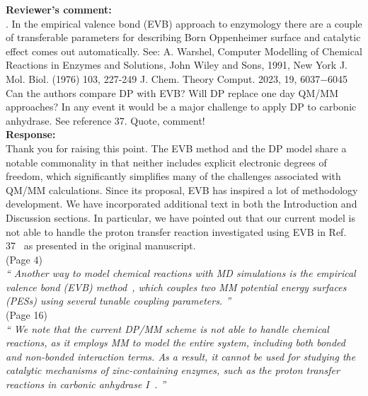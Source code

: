\documentclass[doublespace,prb,aps,preprint]{revtex4}
\newcommand{\Quote}[1]{\textsl{``#1''}}
\newenvironment{Comment}{ {\bf \indent Reviewer's comment: \\} \setlength{\parindent}{1cm}  \sffamily }{ \ignorespacesafterend \\}
\newenvironment{Reply}{  {\bf Response: \\}  \setlength{\parindent}{1cm} \normalfont }{ \ignorespacesafterend \vspace{5mm}}
\newcommand{\HJ}[1]{\textcolor{red}{#1}}
\begin{document}
\begin{Comment}
3. In the empirical valence bond (EVB) approach to enzymology there are a couple of transferable parameters for describing Born Oppenheimer surface and catalytic effect comes out automatically.
See:
A. Warshel, Computer Modelling of Chemical Reactions in Enzymes and Solutions, John Wiley and Sons, 1991, New York
J. Mol. Biol. (1976) 103, 227-249
J. Chem. Theory Comput. 2023, 19, 6037−6045
Can the authors compare DP with EVB? 
Will DP replace one day QM/MM approaches?
In any event it would be a major challenge to apply DP to carbonic anhydrase. See reference 37.
Quote, comment!
\end{Comment}
\begin{Reply}
    Thank you for raising this point. The EVB method and the DP model share a notable commonality in that neither includes explicit electronic degrees of freedom, which significantly simplifies many of the challenges associated with QM/MM calculations. Since its proposal, EVB has inspired a lot of methodology development. We have incorporated additional text in both the Introduction and Discussion sections. In particular, we have pointed out that our current model is not able to handle the proton transfer reaction investigated using EVB in Ref. 37~\cite{aaqvist1992computer} as presented in the original manuscript. \\
    \newline
    (Page 4) \\
    \Quote{
        Another way to model chemical reactions with MD simulations is the empirical valence bond (EVB) method~\cite{warshel1976theoretical, warshel1991computer, oanca2023efficient}, which couples two MM potential energy surfaces (PESs) using several tunable coupling parameters. 
    } \\
    (Page 16) \\
    \Quote{
        We note that the current DP/MM scheme is not able to handle chemical reactions, as it employs MM to model the entire system, including both bonded and non-bonded interaction terms. As a result, it cannot be used for studying the catalytic mechanisms of zinc-containing enzymes, such as the proton transfer reactions in carbonic anhydrase I~\cite{aaqvist1992computer}. 
    }
\end{Reply}
\end{document}
